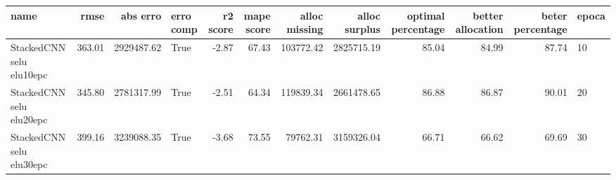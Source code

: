 \begin{tabular}{lrrlrrrrrrrl}
\toprule
name & rmse & abs erro & erro comp & r2 score & mape score & alloc missing & alloc surplus & optimal percentage & better allocation & beter percentage & epoca \\
\midrule
StackedCNN selu elu10epc & 363.01 & 2929487.62 & True & -2.87 & 67.43 & 103772.42 & 2825715.19 & 85.04 & 84.99 & 87.74 & 10 \\
StackedCNN selu elu20epc & 345.80 & 2781317.99 & True & -2.51 & 64.34 & 119839.34 & 2661478.65 & 86.88 & 86.87 & 90.01 & 20 \\
StackedCNN selu elu30epc & 399.16 & 3239088.35 & True & -3.68 & 73.55 & 79762.31 & 3159326.04 & 66.71 & 66.62 & 69.69 & 30 \\
\bottomrule
\end{tabular}
